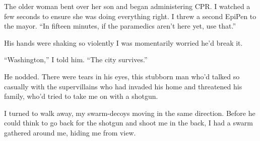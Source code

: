 The older woman bent over her son and began administering CPR.  I watched a few seconds to ensure she was doing everything right.  I threw a second EpiPen to the mayor.  ``In fifteen minutes, if the paramedics aren't here yet, use that.''



His hands were shaking so violently I was momentarily worried he'd break it.



``Washington,'' I told him.  ``The city survives.''



He nodded.  There were tears in his eyes, this stubborn man who'd talked so casually with the supervillains who had invaded his home and threatened his family, who'd tried to take me on with a shotgun.



I turned to walk away, my swarm-decoys moving in the same direction.  Before he could think to go back for the shotgun and shoot me in the back, I had a swarm gathered around me, hiding me from view.





